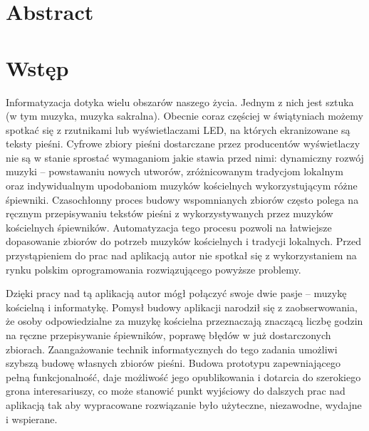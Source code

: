 \documentclass[a4paper,12pt]{article}
\newcommand\spacingIndent{2.2em}
\begin{document}
	\section*{Abstract}
	\newpage 
	\noindent\begin{minipage}[s]{\textwidth}
	\section{Wstęp}
		\hspace{\spacingIndent} Informatyzacja dotyka wielu obszarów naszego       życia. Jednym z nich jest sztuka (w tym muzyka, muzyka        sakralna). Obecnie coraz częściej w świątyniach możemy        spotkać się z rzutnikami lub wyświetlaczami LED, 
			na których ekranizowane są teksty pieśni. Cyfrowe zbiory pieśni dostarczane przez producentów wyświetlaczy 
			nie są w stanie sprostać wymaganiom jakie stawia przed nimi: dynamiczny rozwój muzyki -- powstawaniu nowych utworów, 
			zróżnicowanym tradycjom lokalnym oraz indywidualnym upodobaniom muzyków kościelnych wykorzystującym różne śpiewniki. 
			Czasochłonny proces budowy wspomnianych zbiorów często polega na ręcznym przepisywaniu tekstów pieśni 
			z wykorzystywanych przez muzyków kościelnych śpiewników. Automatyzacja tego procesu pozwoli na łatwiejsze dopasowanie zbiorów 
			do potrzeb muzyków kościelnych i tradycji lokalnych. 
	        Przed przystąpieniem do prac nad aplikacją autor nie      spotkał się z wykorzystaniem na rynku polskim             oprogramowania rozwiązującego powyższe problemy.
		
		 \hspace{\spacingIndent} Dzięki pracy nad tą aplikacją autor mógł połączyć swoje dwie pasje -- muzykę kościelną i informatykę. 
			Pomysł budowy aplikacji narodził się z zaobserwowania, że osoby odpowiedzialne za muzykę kościelna przeznaczają znaczącą liczbę godzin 
			na ręczne przepisywanie śpiewników, poprawę błędów w już dostarczonych zbiorach. Zaangażowanie technik informatycznych do tego zadania 
	        umożliwi szybszą budowę własnych zbiorów pieśni.  
			Budowa prototypu zapewniającego pełną funkcjonalność,  daje możliwość jego opublikowania 
			i dotarcia do szerokiego grona interesariuszy, co może stanowić punkt wyjściowy do dalszych prac nad aplikacją tak aby wypracowane rozwiązanie było użyteczne, niezawodne, wydajne i wspierane.
		

\end{minipage}
\end{document}
